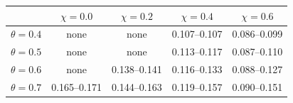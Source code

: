 \begin{tabular}{lcccc}
\toprule
 & $\chi = 0.0$ & $\chi = 0.2$ & $\chi = 0.4$ & $\chi = 0.6$ \\
\midrule
$\theta = 0.4$ & none & none & 0.107--0.107 & 0.086--0.099 \\
$\theta = 0.5$ & none & none & 0.113--0.117 & 0.087--0.110 \\
$\theta = 0.6$ & none & 0.138--0.141 & 0.116--0.133 & 0.088--0.127 \\
$\theta = 0.7$ & 0.165--0.171 & 0.144--0.163 & 0.119--0.157 & 0.090--0.151 \\
\bottomrule
\end{tabular}
